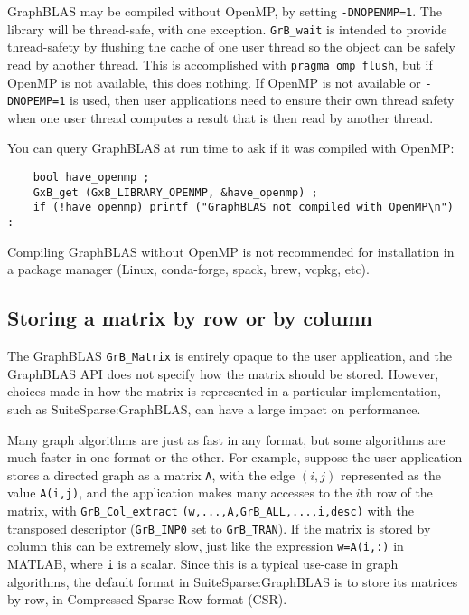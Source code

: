 \documentclass[12pt]{article}
\begin{document}
GraphBLAS may be compiled without OpenMP, by setting \verb'-DNOPENMP=1'.
The library will be thread-safe, with one exception.  \verb'GrB_wait' is
intended to provide thread-safety by flushing the cache of one user thread
so the object can be safely read by another thread.  This is accomplished
with \verb'pragma omp flush', but if OpenMP is not available, this does
nothing.  If OpenMP is not available or \verb'-DNOPEMP=1' is used, then
user applications need to ensure their own thread safety when one user thread
computes a result that is then read by another thread.

You can query GraphBLAS at run time to ask if it was compiled with OpenMP:

\begin{verbatim}
    bool have_openmp ;
    GxB_get (GxB_LIBRARY_OPENMP, &have_openmp) ;
    if (!have_openmp) printf ("GraphBLAS not compiled with OpenMP\n") :
\end{verbatim}

Compiling GraphBLAS without OpenMP is not recommended for installation in a
package manager (Linux, conda-forge, spack, brew, vcpkg, etc).

\subsection{Storing a matrix by row or by column}

The GraphBLAS \verb'GrB_Matrix' is entirely opaque to the user application, and
the GraphBLAS API does not specify how the matrix should be stored.  However,
choices made in how the matrix is represented in a particular implementation,
such as SuiteSparse:GraphBLAS, can have a large impact on performance.

Many graph algorithms are just as fast in any format, but some algorithms are
much faster in one format or the other.  For example, suppose the user
application stores a directed graph as a matrix \verb'A', with the edge $(i,j)$
represented as the value \verb'A(i,j)', and the application makes many accesses
to the $i$th row of the matrix, with \verb'GrB_Col_extract'
\verb'(w,...,A,GrB_ALL,...,i,desc)' with the transposed descriptor
(\verb'GrB_INP0' set to \verb'GrB_TRAN').  If the matrix is stored by column
this can be extremely slow, just like the expression \verb'w=A(i,:)' in MATLAB,
where \verb'i' is a scalar.  Since this is a typical use-case in graph
algorithms, the default format in SuiteSparse:GraphBLAS is to store its
matrices by row, in Compressed Sparse Row format (CSR).
\end{document}
